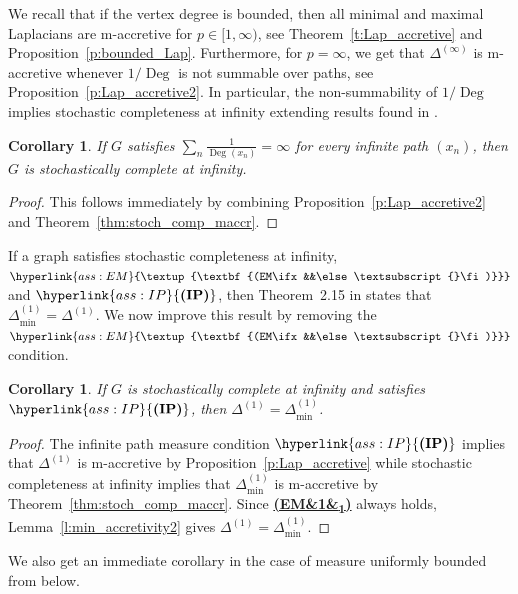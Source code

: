 \documentclass[letterpaper]{article}
\newtheorem{corollary}[lemma]{Corollary}
\theoremstyle{definition}
\theoremstyle{named}
\numberwithin{equation}{section}
\newcommand{\IP}{\hyperlink{ass:IP}{\textup{\textbf{(IP)}}}}
\newcommand{\EM}[1][]{\hyperlink{ass:EM}{\textup{\textbf{(EM\ifx&#1&\else\textsubscript{#1}\fi)}}}}
\newcommand{\Deg}{\operatorname{Deg}}
\newcommand{\deltam}{\Delta_{\min}}
\begin{document}
We recall that if the vertex degree is bounded, then all minimal and maximal Laplacians are m-accretive
for $p\in[1,\infty)$, see Theorem~\ref{t:Lap_accretive} and Proposition~\ref{p:bounded_Lap}. 
Furthermore, for $p=\infty$, we get that $\Delta^{(\infty)}$ is m-accretive
whenever $1/\Deg$ is not summable over paths, see Proposition~\ref{p:Lap_accretive2}.
In particular, the non-summability of $1/\Deg$ implies stochastic completeness at infinity
extending results found in \cite{KL10, Woj21}. 

\begin{corollary}
    If $G$ satisfies $\sum_{n} \frac{1}{\Deg(x_{n})}=\infty$ for every infinite path $(x_n)$, then
    $G$ is stochastically complete at infinity.
\end{corollary}
\begin{proof}
    This follows immediately by combining Proposition~\ref{p:Lap_accretive2} and 
    Theorem~\ref{thm:stoch_comp_maccr}.
\end{proof}

If a graph satisfies stochastic completeness at infinity, $\EM$ and $\IP$, then Theorem~2.15 in 
\cite{milatovic2015maximal} states that $\Delta_{\min}^{(1)}=\Delta^{(1)}$. 
We now improve this result by removing the $\EM$ condition.
\begin{corollary}\label{c:min_ell1}
    If $G$ is stochastically complete at infinity and satisfies $\IP$, then $\Delta^{(1)}=\Delta_{\min}^{(1)}$.
\end{corollary}
\begin{proof}
    {The infinite path measure condition $\IP$ implies that $\Delta^{(1)}$ is m-accretive by Proposition~\ref{p:Lap_accretive}
    while stochastic completeness at infinity implies that $\deltam^{(1)}$ is m-accretive by Theorem~\ref{thm:stoch_comp_maccr}. Since \EM[1] always holds,
    Lemma~\ref{l:min_accretivity2} gives $\Delta^{(1)}=\Delta_{\min}^{(1)}$.}
\end{proof}
 

We also get an immediate corollary in the case of measure uniformly bounded from below.
\end{document}
